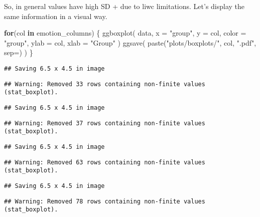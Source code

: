 \documentclass[
]{article}
\newenvironment{Shaded}{\begin{snugshade}}{\end{snugshade}}
\newcommand{\AttributeTok}[1]{\textcolor[rgb]{0.77,0.63,0.00}{#1}}
\newcommand{\ControlFlowTok}[1]{\textcolor[rgb]{0.13,0.29,0.53}{\textbf{#1}}}
\newcommand{\FunctionTok}[1]{\textcolor[rgb]{0.00,0.00,0.00}{#1}}
\newcommand{\NormalTok}[1]{#1}
\newcommand{\StringTok}[1]{\textcolor[rgb]{0.31,0.60,0.02}{#1}}
\begin{document}
So, in general values have high SD + due to liwc limitations. Let's
display the same information in a visual way.

\begin{Shaded}
\begin{Highlighting}[]
\ControlFlowTok{for}\NormalTok{(col }\ControlFlowTok{in}\NormalTok{ emotion\_columns) \{}
  \FunctionTok{ggboxplot}\NormalTok{(}
\NormalTok{    data, }
    \AttributeTok{x =} \StringTok{"group"}\NormalTok{, }\AttributeTok{y =}\NormalTok{ col, }
    \AttributeTok{color =} \StringTok{"group"}\NormalTok{,}
    \AttributeTok{ylab =}\NormalTok{ col, }\AttributeTok{xlab =} \StringTok{"Group"}
\NormalTok{  )}
  \FunctionTok{ggsave}\NormalTok{(}
    \FunctionTok{paste}\NormalTok{(}\StringTok{"plots/boxplots/"}\NormalTok{, col, }\StringTok{".pdf"}\NormalTok{, }\AttributeTok{sep=}\StringTok{\textquotesingle{}\textquotesingle{}}\NormalTok{)}
\NormalTok{  )}
\NormalTok{\}}
\end{Highlighting}
\end{Shaded}

\begin{verbatim}
## Saving 6.5 x 4.5 in image
\end{verbatim}

\begin{verbatim}
## Warning: Removed 33 rows containing non-finite values (stat_boxplot).
\end{verbatim}

\begin{verbatim}
## Saving 6.5 x 4.5 in image
\end{verbatim}

\begin{verbatim}
## Warning: Removed 37 rows containing non-finite values (stat_boxplot).
\end{verbatim}

\begin{verbatim}
## Saving 6.5 x 4.5 in image
\end{verbatim}

\begin{verbatim}
## Warning: Removed 63 rows containing non-finite values (stat_boxplot).
\end{verbatim}

\begin{verbatim}
## Saving 6.5 x 4.5 in image
\end{verbatim}

\begin{verbatim}
## Warning: Removed 78 rows containing non-finite values (stat_boxplot).
\end{verbatim}
\end{document}
